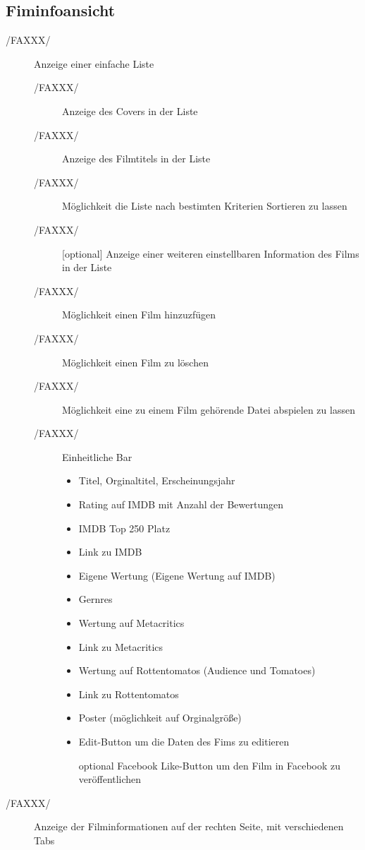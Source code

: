 \subsection{Fiminfoansicht}
\begin{description}
	\item[/FAXXX/] Anzeige einer einfache Liste
	\begin{description}
		\item[/FAXXX/] Anzeige des Covers in der Liste
		\item[/FAXXX/] Anzeige des Filmtitels in der Liste
		\item[/FAXXX/] Möglichkeit die Liste nach bestimten Kriterien Sortieren zu lassen
		\item[/FAXXX/] [optional] Anzeige einer weiteren einstellbaren Information des Films in der Liste
		\item[/FAXXX/] Möglichkeit einen Film hinzuzfügen
		\item[/FAXXX/] Möglichkeit einen Film zu löschen
		\item[/FAXXX/] Möglichkeit eine zu einem Film gehörende Datei abspielen zu lassen
		\item[/FAXXX/] Einheitliche Bar
		\begin{itemize}
			\item Titel, Orginaltitel, Erscheinungsjahr
			\item Rating auf IMDB mit Anzahl der Bewertungen
			\item IMDB Top 250 Platz
			\item Link zu IMDB
			\item Eigene Wertung (Eigene Wertung auf IMDB)
			\item Gernres
			\item Wertung auf Metacritics
			\item Link zu Metacritics
			\item Wertung auf Rottentomatos (Audience und Tomatoes)
			\item Link zu Rottentomatos
			\item Poster (möglichkeit auf Orginalgröße)
			\item Edit-Button um die Daten des Fims zu editieren
			\item [optional] Facebook Like-Button um den Film in Facebook zu veröffentlichen
		\end{itemize}
	\end{description}
	\item[/FAXXX/] Anzeige der Filminformationen auf der rechten Seite, mit verschiedenen Tabs

\end{description}
